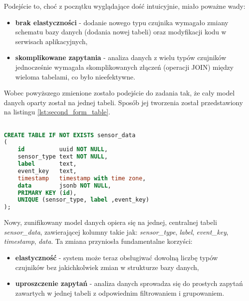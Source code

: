 \vspace{0.3em}

Podejście to, choć z początku wyglądające dość intuicyjnie, miało poważne wady:

\vspace{0.3em}

\begin{itemize}
    \item \textbf{brak elastyczności} - dodanie nowego typu czujnika wymagało zmiany schematu bazy danych (dodania nowej tabeli) oraz modyfikacji kodu w serwisach aplikacyjnych,
    \item \textbf{skomplikowane zapytania} - analiza danych z wielu typów czujników jednocześnie wymagała skomplikowanych złączeń (operacji JOIN) \cite{kleppmann2017designing} między wieloma tabelami, co było nieefektywne.
\end{itemize}

\vspace{0.3em}

Wobec powyższego zmienione zostało podejście do zadania tak, że cały model danych oparty został na jednej tabeli. Sposób jej tworzenia został przedstawiony na listingu \ref{lst:second_form_table}.

\vspace{0.3em}


\begin{lstlisting}[caption=Druga forma tabeli w relacyjnej bazie danych, label={lst:second_form_table},language=SQL]

CREATE TABLE IF NOT EXISTS sensor_data
(
    id          uuid NOT NULL,
    sensor_type text NOT NULL,
    label       text,
    event_key   text,
    timestamp   timestamp with time zone,
    data        jsonb NOT NULL,
    PRIMARY KEY (id),
    UNIQUE (sensor_type, label ,event_key)
);
\end{lstlisting}


Nowy, zunifikowany model danych opiera się na jednej, centralnej tabeli \textit{sensor\_data}, zawierającej kolumny takie jak: \textit{sensor\_type}, \textit{label}, \textit{event\_key}, \textit{timestamp}, \textit{data}. Ta zmiana przyniosła fundamentalne korzyści:

\vspace{0.3em}

\begin{itemize}
    \item \textbf{elastyczność} - system może teraz obsługiwać dowolną liczbę typów czujników bez jakichkolwiek zmian w strukturze bazy danych,
    \item \textbf{uproszczenie zapytań} - analiza danych sprowadza się do prostych zapytań zawartych w jednej tabeli z odpowiednim filtrowaniem i grupowaniem.
\end{itemize}

